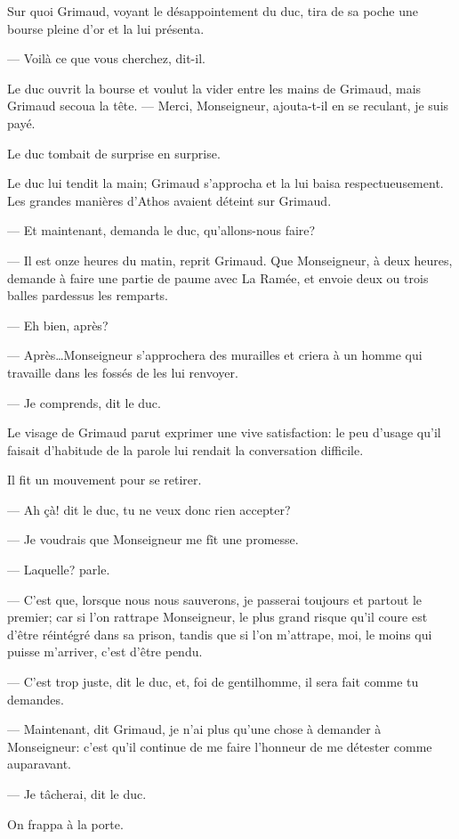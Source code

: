 Sur quoi Grimaud, voyant le désappointement du duc, tira de sa poche une bourse pleine d'or et la lui présenta.

— Voilà ce que vous cherchez, dit-il.

Le duc ouvrit la bourse et voulut la vider entre les mains de Grimaud, mais Grimaud secoua la tête.
— Merci, Monseigneur, ajouta-t-il en se reculant, je suis payé.

Le duc tombait de surprise en surprise.

Le duc lui tendit la main; Grimaud s'approcha et la lui baisa respectueusement. Les grandes manières d'Athos avaient déteint sur Grimaud.

— Et maintenant, demanda le duc, qu'allons-nous faire?

— Il est onze heures du matin, reprit Grimaud. Que Monseigneur, à deux heures, demande à faire une partie de paume avec La Ramée, et envoie deux ou trois balles pardessus les remparts.

— Eh bien, après?

— Après\dots Monseigneur s'approchera des murailles et criera à un homme qui travaille dans les fossés de les lui renvoyer.

— Je comprends, dit le duc.

Le visage de Grimaud parut exprimer une vive satisfaction: le peu d'usage qu'il faisait d'habitude de la parole lui rendait la conversation difficile.

Il fit un mouvement pour se retirer.

— Ah çà! dit le duc, tu ne veux donc rien accepter?

— Je voudrais que Monseigneur me fît une promesse.

— Laquelle? parle.

— C'est que, lorsque nous nous sauverons, je passerai toujours et partout le premier; car si l'on rattrape Monseigneur, le plus grand risque qu'il coure est d'être réintégré dans sa prison, tandis que si l'on m'attrape, moi, le moins qui puisse m'arriver, c'est d'être pendu.

— C'est trop juste, dit le duc, et, foi de gentilhomme, il sera fait comme tu demandes.

— Maintenant, dit Grimaud, je n'ai plus qu'une chose à demander à Monseigneur: c'est qu'il continue de me faire l'honneur de me détester comme auparavant.

— Je tâcherai, dit le duc.

On frappa à la porte.

